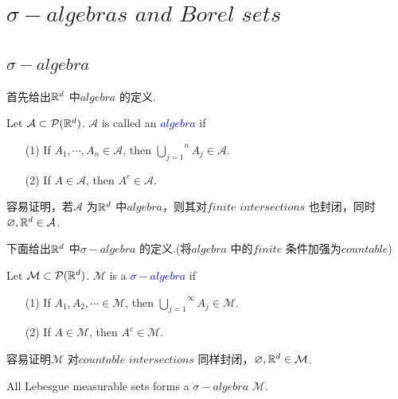 \newpage
\section{$\sigma-algebras \,\, and \,\, Borel \,\, sets$}
\subsection{$\sigma-algebra$}
	首先给出$\mathbb{R}^d$ 中\textbf{$algebra$} 的定义.
	\begin{defn}
		Let $\mathcal{A} \subset \mathcal{P}(\mathbb{R}^d)$. $\mathcal{A}$ is called an \underline{\textcolor{blue}{\textbf{$algebra$}}} if
		\begin{enumerate}
			\item[(1)]If $A_1 , \cdots , A_n \in \mathcal{A}$, then $\overset{n}{\underset{j = 1}{\bigcup}}{A_j} \in \mathcal{A}$.
			
			\item[(2)]If $A \in \mathcal{A}$, then $A^c \in \mathcal{A}$.
		\end{enumerate}
		
		\begin{rmk}
			容易证明，若$\mathcal{A}$ 为$\mathbb{R}^d$ 中$algebra$，则其对$finite \,\, intersections$ 也封闭，同时$\varnothing , \mathbb{R}^d \in \mathcal{A}$.
		\end{rmk}
	\end{defn}

	\vspace{2em}
	下面给出$\mathbb{R}^d$ 中$\sigma-algebra$ 的定义.(将$algebra$ 中的$finite$ 条件加强为$countable$)
	\begin{defn}
		Let $\mathcal{M} \subset \mathcal{P}(\mathbb{R}^d)$. $\mathcal{M}$ is a \underline{\textcolor{blue}{$\sigma-algebra$}} if
		\begin{enumerate}
			\item[(1)]If $A_1 , A_2 , \cdots \in \mathcal{M}$, then $\overset{\infty}{\underset{j = 1}{\bigcup}}{A_j} \in \mathcal{M}$.
			
			\item[(2)]If $A \in \mathcal{M}$, then $A^c \in \mathcal{M}$.
		\end{enumerate}
		
		\begin{rmk}
			容易证明$\mathcal{M}$ 对$countable \,\, intersections$ 同样封闭，$\varnothing , \mathbb{R}^d \in \mathcal{M}$.
		\end{rmk}
		
		\begin{example}
			All Lebesgue measurable sets forms a $\sigma-algebra$ $\mathcal{M}$.
		\end{example}
	\end{defn}

